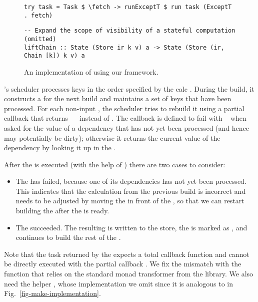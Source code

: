 \begin{figure}
\begin{verbatim}
try task = Task $ \fetch -> runExceptT $ run task (ExceptT . fetch)
\end{verbatim}
\vspace{1mm}
\begin{verbatim}
-- Expand the scope of visibility of a stateful computation (omitted)
liftChain :: State (Store ir k v) a -> State (Store (ir, Chain [k]) k v) a
\end{verbatim}
\caption{An implementation of \Excel using our framework.}\label{fig-excel-implementation}
\end{figure}

\Excel's  scheduler processes keys in the order specified by the
calc . During the build, it constructs a  for the next
build and maintains a set of keys  that have been processed. For each
non-input , the scheduler tries to rebuild it using a partial 
callback that returns ~~ instead of . The callback
is defined to fail with ~ when asked for the value of a
dependency  that has not yet been processed (and hence may potentially
be dirty); otherwise it returns the current value of the dependency by looking
it up in the .

After the  is executed (with the help of ) there are
two cases to consider:

\begin{itemize}
    \item The  has failed, because one of its dependencies 
    has not yet been processed. This indicates that the calculation 
    from the previous build is incorrect and needs to be adjusted by moving the
     in front of the , so that we can restart building the
     after the  is ready.
    \item The  succeeded. The resulting  is written to
    the store, the  is marked as , and \Excel continues to
    build the rest of the .
\end{itemize}

Note that the task returned by the  expects a total callback
function and cannot be directly executed with the partial callback .
We fix the mismatch with the function  that relies on the standard
monad transformer  from the  library. We also
need the helper , whose implementation we omit since it
is analogous to  in Fig.~\ref{fig-make-implementation}.

